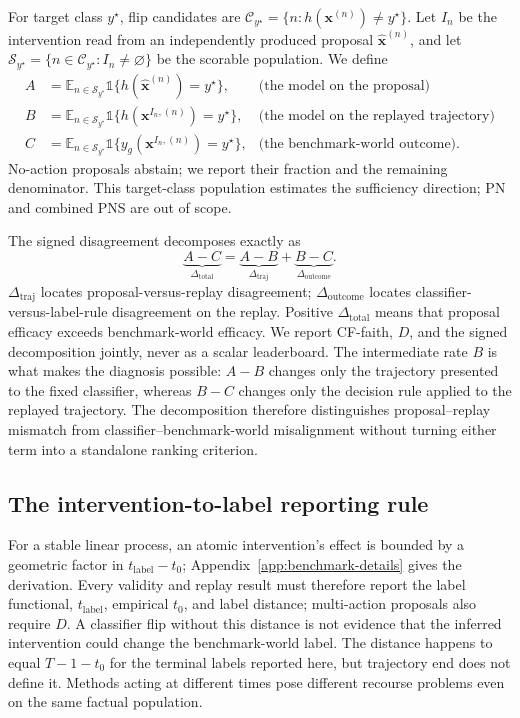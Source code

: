 \documentclass{article}
\newcommand{\bx}{\mathbf{x}}
\newcommand{\dototal}{\Delta_{\mathrm{total}}}
\newcommand{\dotraj}{\Delta_{\mathrm{traj}}}
\newcommand{\dooutcome}{\Delta_{\mathrm{outcome}}}
\begin{document}
For target class $y^\star$, flip candidates are $\mathcal{C}_{y^\star}=\{n:h(\bx^{(n)})\neq y^\star\}$.  Let $I_n$ be the intervention read from an independently produced proposal $\hat{\bx}^{(n)}$, and let $\mathcal{S}_{y^\star}=\{n\in\mathcal{C}_{y^\star}:I_n\neq\varnothing\}$ be the scorable population.  We define
\begin{align}
  A &= \mathbb{E}_{n\in\mathcal{S}_{y^\star}}
       \mathbb{1}\{h(\hat{\bx}^{(n)})=y^\star\},
  &\text{(the model on the proposal)}\nonumber\\
  B &= \mathbb{E}_{n\in\mathcal{S}_{y^\star}}
       \mathbb{1}\{h(\bx^{I_n,(n)})=y^\star\},
  &\text{(the model on the replayed trajectory)}\nonumber\\
  C &= \mathbb{E}_{n\in\mathcal{S}_{y^\star}}
       \mathbb{1}\{y_g(\bx^{I_n,(n)})=y^\star\},
  &\text{(the benchmark-world outcome).}
  \label{eq:abc}
\end{align}
No-action proposals abstain; we report their fraction and the remaining denominator.  This target-class population estimates the sufficiency direction; PN and combined PNS are out of scope.

The signed disagreement decomposes exactly as
\begin{equation}
  \underbrace{A-C}_{\dototal}
  =\underbrace{A-B}_{\dotraj}
  +\underbrace{B-C}_{\dooutcome}.
  \label{eq:delta-decomposition}
\end{equation}
$\dotraj$ locates proposal-versus-replay disagreement; $\dooutcome$ locates classifier-versus-label-rule disagreement on the replay. Positive $\dototal$ means that proposal efficacy exceeds benchmark-world efficacy. We report CF-faith, $D$, and the signed decomposition jointly, never as a scalar leaderboard. The intermediate rate $B$ is what makes the diagnosis possible: $A-B$ changes only the trajectory presented to the fixed classifier, whereas $B-C$ changes only the decision rule applied to the replayed trajectory. The decomposition therefore distinguishes proposal--replay mismatch from classifier--benchmark-world misalignment without turning either term into a standalone ranking criterion.

\subsection{The intervention-to-label reporting rule}

For a stable linear process, an atomic intervention's effect is bounded by a geometric factor in $t_{\mathrm{label}}-t_0$; Appendix~\ref{app:benchmark-details} gives the derivation. Every validity and replay result must therefore report the label functional, $t_{\mathrm{label}}$, empirical $t_0$, and label distance; multi-action proposals also require $D$. A classifier flip without this distance is not evidence that the inferred intervention could change the benchmark-world label. The distance happens to equal $T-1-t_0$ for the terminal labels reported here, but trajectory end does not define it. Methods acting at different times pose different recourse problems even on the same factual population.
\end{document}
